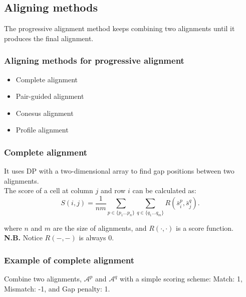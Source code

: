 %
%

%
%
\subsection{Aligning methods}
The progressive alignment method keeps combining two alignments until it produces the final alignment.

%
%
\subsubsection*{Aligning methods for progressive alignment}
\begin{itemize}
\item Complete alignment
\item Pair-guided alignment
\item Conesus alignment
\item Profile alignment
\end{itemize}

%
%
\subsubsection*{Complete alignment}
It uses DP with a two-dimensional array to find gap positions between two alignments. \\

\noindent
The score of a cell at column $j$ and row $i$ can be calculated as: 
 \[
S(i,j)= \dfrac{1}{nm}\sum_{p \in \{p_1 \ldots p_n\}} \sum_{q \in \{q_1 \ldots q_m\}} R(\bar{s}_i^p,\bar{s}_j^q).
 \]

where $n$ and $m$ are the size of alignments, and $R(\cdot,\cdot)$ is a score function. \\

\noindent
\textbf{N.B.} Notice $R(-,-)$ is always 0.

%
%
\subsubsection*{Example of complete alignment}
Combine two alignments, $\mathcal{A}^p$ and $\mathcal{A}^q$ with a simple scoring scheme:  Match: 1, Mismatch: -1, and Gap penalty: 1.

